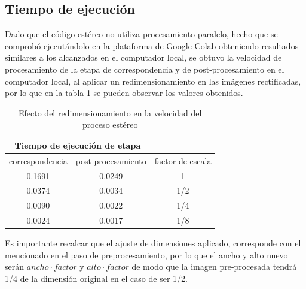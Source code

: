 \subsection{Tiempo de ejecución}
Dado que el código estéreo no utiliza procesamiento paralelo, hecho que se comprobó ejecutándolo en la plataforma de Google Colab obteniendo resultados similares a los alcanzados en el computador local, se obtuvo la velocidad de procesamiento de la etapa de correspondencia y de post-procesamiento en el computador local, al aplicar un redimensionamiento en las imágenes rectificadas, por lo que en la tabla \ref{speed_matching_results} se pueden observar los valores obtenidos.
\begin{table}[H]
\caption{Efecto del redimensionamiento en la velocidad del proceso estéreo}
\label{speed_matching_results}
\begin{tabular}{|cc|c}
\cline{1-2}
\multicolumn{2}{|c|}{Tiempo de ejecución de etapa}         &                                           \\ \hline
\multicolumn{1}{|c|}{correspondencia} & post-procesamiento & \multicolumn{1}{c|}{factor de escala} \\ \hline
\multicolumn{1}{|c|}{0.1691}          & 0.0249             & \multicolumn{1}{c|}{1}                    \\ \hline
\multicolumn{1}{|c|}{0.0374}          & 0.0034             & \multicolumn{1}{c|}{1/2}                  \\ \hline
\multicolumn{1}{|c|}{0.0090}          & 0.0022             & \multicolumn{1}{c|}{1/4}                  \\ \hline
\multicolumn{1}{|c|}{0.0024}          & 0.0017             & \multicolumn{1}{c|}{1/8}                  \\ \hline
\end{tabular}
\end{table}
Es importante recalcar que el ajuste de dimensiones aplicado, corresponde con el mencionado en el paso de preprocesamiento, por lo que el ancho y alto nuevo serán $ancho\cdot factor$ y $alto\cdot factor$ de modo que la imagen pre-procesada tendrá 1/4 de la dimensión original en el caso de ser 1/2.
